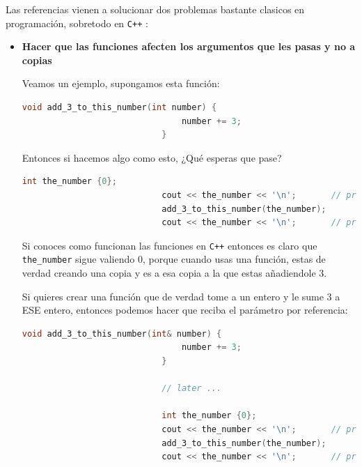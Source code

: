 \documentclass[12pt, fleqn]{report}                             %
\theoremstyle{break}                                            %
\newcommand{\textCode}[1]  { \texttt{#1} }                      %
\newcommand{\Cpp}{\ignorespaces\textCode{C++}}                  %
\begin{document}
                Las referencias vienen a solucionar dos problemas bastante clasicos en programación, 
                sobretodo en \Cpp:
                \begin{itemize}
                    \item \textbf{Hacer que las funciones afecten los argumentos que les pasas y no a copias}
                        
                        Veamos un ejemplo, supongamos esta función:
                        \begin{lstlisting}[language=C++, gobble=28]
                            void add_3_to_this_number(int number) {
                                number += 3;
                            }
                        \end{lstlisting}

                        Entonces si hacemos algo como esto, ¿Qué esperas que pase?
                        \begin{lstlisting}[language=C++, gobble=28]
                            int the_number {0};
                            cout << the_number << '\n';       // prints 0
                            add_3_to_this_number(the_number);
                            cout << the_number << '\n';       // prints 0 :c
                        \end{lstlisting}

                        Si conoces como funcionan las funciones en \Cpp entonces es claro que
                        \textCode{the\_number} sigue valiendo 0, porque cuando usas una función,
                        estas de verdad creando una copia y es a esa copia a la que estas añadiendole 3.

                        Si quieres crear una función que de verdad tome a un entero y le sume 3 a ESE entero,
                        entonces podemos hacer que reciba el parámetro por referencia:
                        \begin{lstlisting}[language=C++, gobble=28]
                            void add_3_to_this_number(int& number) {
                                number += 3;
                            }

                            // later ...
                            
                            int the_number {0};
                            cout << the_number << '\n';       // prints 0
                            add_3_to_this_number(the_number);
                            cout << the_number << '\n';       // prints 3 :)
                        \end{lstlisting}


\end{itemize}
\end{document}
